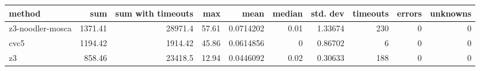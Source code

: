 \begin{tabular}{lrrrrrrrrr}
\hline
 method           &     sum &   sum with timeouts &   max &      mean &   median &   std. dev &   timeouts &   errors &   unknowns \\
\hline
 z3-noodler-mosca & 1371.41 &            28971.4  & 57.61 & 0.0714202 &     0.01 &    1.33674 &        230 &        0 &          0 \\
 cvc5             & 1194.42 &             1914.42 & 45.86 & 0.0614856 &     0    &    0.86702 &          6 &        0 &          0 \\
 z3               &  858.46 &            23418.5  & 12.94 & 0.0446092 &     0.02 &    0.30633 &        188 &        0 &          0 \\
\hline
\end{tabular}
